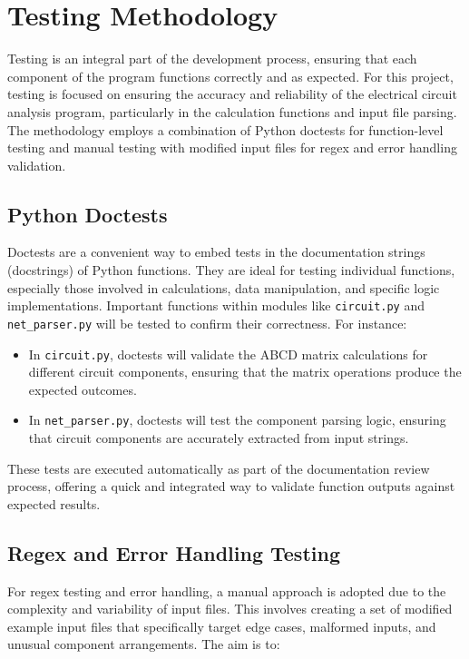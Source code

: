 \documentclass[a4paper]{article}
\begin{document}
\section{Testing Methodology}

Testing is an integral part of the development process, ensuring that each component of the program functions correctly and as expected. For this project, testing is focused on ensuring the accuracy and reliability of the electrical circuit analysis program, particularly in the calculation functions and input file parsing. The methodology employs a combination of Python doctests for function-level testing and manual testing with modified input files for regex and error handling validation.

\subsection{Python Doctests}
Doctests are a convenient way to embed tests in the documentation strings (docstrings) of Python functions. They are ideal for testing individual functions, especially those involved in calculations, data manipulation, and specific logic implementations. Important functions within modules like \texttt{circuit.py} and \texttt{net\_parser.py} will be tested to confirm their correctness. For instance:

\begin{itemize}
    \item In \texttt{circuit.py}, doctests will validate the ABCD matrix calculations for different circuit components, ensuring that the matrix operations produce the expected outcomes.
    \item In \texttt{net\_parser.py}, doctests will test the component parsing logic, ensuring that circuit components are accurately extracted from input strings.
\end{itemize}

These tests are executed automatically as part of the documentation review process, offering a quick and integrated way to validate function outputs against expected results.

\subsection{Regex and Error Handling Testing}
For regex testing and error handling, a manual approach is adopted due to the complexity and variability of input files. This involves creating a set of modified example input files that specifically target edge cases, malformed inputs, and unusual component arrangements. The aim is to:
\end{document}
